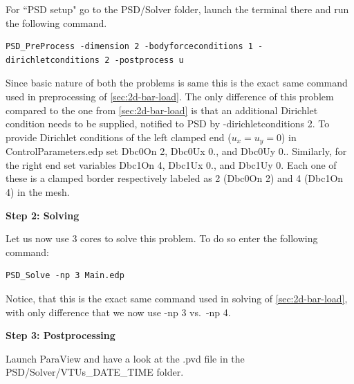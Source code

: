 For ``PSD setup" go to the {\ttfamily PSD/Solver} folder, launch the terminal there and run the following command.
\begin{lstlisting}[style=Linux]
PSD_PreProcess -dimension 2 -bodyforceconditions 1 -dirichletconditions 2 -postprocess u
\end{lstlisting}
%
Since basic nature of both the problems is same this is the exact same command used in preprocessing of \cref{sec:2d-bar-load}. The only difference of this problem compared to the one from \cref{sec:2d-bar-load} is that an additional Dirichlet condition needs to be supplied, notified to PSD by {\ttfamily -dirichletconditions 2}. To provide Dirichlet conditions of the left clamped end ($u_x=u_y=0$) in {\ttfamily ControlParameters.edp} set {\ttfamily Dbc0On 2}, {\ttfamily Dbc0Ux 0.}, and {\ttfamily Dbc0Uy 0.}. Similarly, for the right end set variables {\ttfamily Dbc1On 4}, {\ttfamily Dbc1Ux 0.}, and {\ttfamily Dbc1Uy 0}. Each one of these is a clamped border respectively labeled as 2  ({\ttfamily Dbc0On 2}) and 4 ({\ttfamily Dbc1On 4}) in the mesh.

\textbf{Step 2: Solving}

Let us now use  3 cores to solve this problem. To do so enter the following command:

\begin{lstlisting}[style=Linux]
PSD_Solve -np 3 Main.edp
\end{lstlisting}
%
Notice, that this is the exact same command used in solving of \cref{sec:2d-bar-load}, with only difference that we now use {\ttfamily -np 3} vs.~{\ttfamily -np 4}.


\textbf{Step 3: Postprocessing}

Launch ParaView and have a look at the  {\ttfamily .pvd} file in the  {\ttfamily PSD/Solver/VTUs\_DATE\_TIME} folder. 


